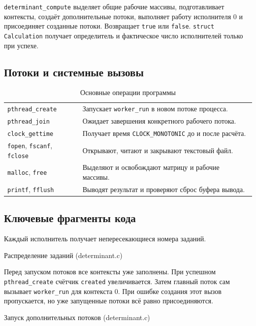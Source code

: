 \documentclass[12pt,a4paper]{article}
\begin{document}
\texttt{determinant\_compute} выделяет общие рабочие массивы, подготавливает контексты, создаёт дополнительные потоки, выполняет работу исполнителя 0 и присоединяет созданные потоки. Возвращает \texttt{true} или \texttt{false}. \texttt{struct Calculation} получает определитель и фактическое число исполнителей только при успехе.

\subsection{Потоки и системные вызовы}
\begin{table}[H]
\caption{Основные операции программы}
\begin{tabularx}{\linewidth}{|P{4.6cm}|L|}
\hline
{} &  \\ \hline
\texttt{pthread\_create} & Запускает \texttt{worker\_run} в новом потоке процесса. \\ \hline
\texttt{pthread\_join} & Ожидает завершения конкретного рабочего потока. \\ \hline
\texttt{clock\_gettime} & Получает время \texttt{CLOCK\_MONOTONIC} до и после расчёта. \\ \hline
\texttt{fopen}, \texttt{fscanf}, \texttt{fclose} & Открывают, читают и закрывают текстовый файл. \\ \hline
\texttt{malloc}, \texttt{free} & Выделяют и освобождают матрицу и рабочие массивы. \\ \hline
\texttt{printf}, \texttt{fflush} & Выводят результат и проверяют сброс буфера вывода. \\ \hline
\end{tabularx}
\end{table}

\subsection{Ключевые фрагменты кода}
Каждый исполнитель получает непересекающиеся номера заданий.
\begin{listingblock}{Распределение заданий (determinant.c)}
\end{listingblock}

Перед запуском потоков все контексты уже заполнены. При успешном \texttt{pthread\_create} счётчик \texttt{created} увеличивается. Затем главный поток сам вызывает \texttt{worker\_run} для контекста 0. При ошибке создания этот вызов пропускается, но уже запущенные потоки всё равно присоединяются.
\begin{listingblock}{Запуск дополнительных потоков (determinant.c)}
\end{listingblock}
\end{document}
